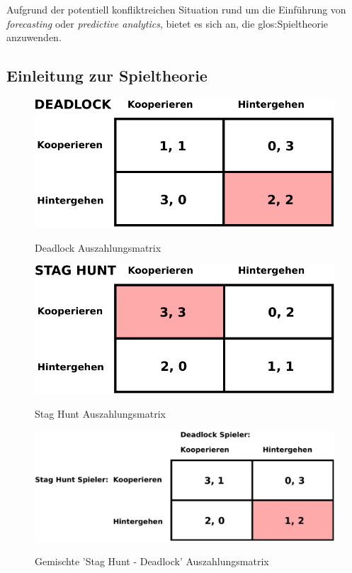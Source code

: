 Aufgrund der potentiell konfliktreichen Situation rund um die Einführung von
\emph{forecasting} oder \emph{predictive analytics}, bietet es sich an, die
\gls{glos:Spieltheorie} anzuwenden.

\subsection{Einleitung zur Spieltheorie}


\begin{figure}%
\centering
\caption{Deadlock Auszahlungsmatrix}
\includegraphics[scale=0.8]{Grafiken/Deadlock_Ink.pdf} 
\label{pic:Deadlock}
\end{figure}

\begin{figure}%
\centering
\caption{Stag Hunt Auszahlungsmatrix}
\includegraphics[scale=0.8]{Grafiken/Stag_Hunt_Ink.pdf} 
\label{pic:StagHunt}
\end{figure}

\begin{figure}%
\centering
\caption{Gemischte 'Stag Hunt - Deadlock' Auszahlungsmatrix}
\includegraphics[scale=0.7]{Grafiken/Mixed_Ink.pdf} 
\label{pic:Mixed}
\end{figure}


